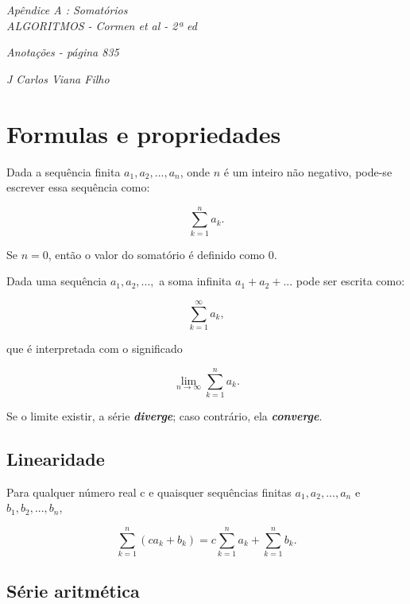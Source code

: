 \documentclass[a4paper,11pt,fleqn]{article}
\begin{document}

\begin{center}
\textsl{\LARGE Apêndice A : Somatórios}\\

\textsl{\large ALGORITMOS - Cormen et al - 2ª ed}
\end{center}

\begin{flushright}
\emph{Anotações - página 835}
\end{flushright}

\begin{flushright}
\emph{J Carlos Viana Filho}
\end{flushright}

\section{Formulas e propriedades}

Dada a sequência finita $a_{1}, a_{2}, ..., a_{n}$, onde $n$ é um inteiro não negativo, pode-se escrever essa sequência como:

\[ \sum\limits_{k=1}^{n}a_{k}. \]

Se $n=0$, então o valor do somatório é definido como $0$.

Dada uma sequência $a_{1}, a_{2}, ...,$ a soma infinita $a_{1} + a_{2} + ...$ pode ser escrita como:


\[ \sum\limits_{k=1}^{\infty}a_{k}, \]

que é interpretada com o significado

\[\lim_{n \to \infty} \sum\limits_{k=1}^{n}a_{k}. \]

Se o limite existir, a série \textbf{\textit{diverge}}; caso contrário, ela \textbf{\textit{converge}}.

\subsection{Linearidade}

Para qualquer número real c e quaisquer sequências finitas $a_{1}, a_{2}, ..., a_{n}$ e $b_{1}, b_{2}, ..., b_{n}$,

\[ \sum\limits_{k=1}^{n}(ca_{k} + b_{k}) = c\sum\limits_{k=1}^{n}a_{k} + \sum\limits_{k=1}^{n}b_{k}. \]

\subsection{Série aritmética}
\end{document}
